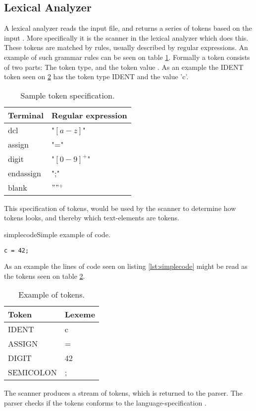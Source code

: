 \subsection{Lexical Analyzer}
A lexical analyzer reads the input file, and returns a series of tokens based on the input \citep{CraftingACompiler}. More specifically it is the scanner in the lexical analyzer which does this. These tokens are matched by rules, usually described by regular expressions. An example of such grammar rules can be seen on table \ref{tab:tokenspecification}. Formally a token consists of two parts: The token type, and the token value \citep{CraftingACompiler}. As an example the IDENT token seen on \ref{tab:tokensexample} has the token type IDENT and the value 'c'. 

\begin{table}[H]
\begin{tabular}{|l|l|}
\hline
    	Terminal  	& Regular expression 	\\ \hline
    	dcl       	& "$[a-z]$"      		\\ 
    	assign    	& "="      				\\ 
    	digit     	& "$[0-9]^+$"   		\\ 
    	endassign 	& ";"      				\\
    	blank 		& $" "^+$				\\
    \hline
\end{tabular}
\caption{Sample token specification.}
\label{tab:tokenspecification}
\end{table}
This specification of tokens, would be used by the scanner to determine how tokens looks, and thereby which text-elements are tokens. 

\begin{code}{simplecode}{Simple example of code.}
\begin{lstlisting}
c = 42;
\end{lstlisting}
\end{code}

As an example the lines of code seen on listing \ref{lst:simplecode} might be read as the tokens seen on table \ref{tab:tokensexample}.
\begin{table}[H]
\begin{tabular}{|l|l|}
\hline
    \textbf{Token}	&	\textbf{Lexeme} \\ \hline
    IDENT     		&	c      			\\ 
    ASSIGN    		&	=      			\\ 
    DIGIT     		&	42    			\\ 
    SEMICOLON 		&	;      			\\ \hline
\end{tabular}
\caption{Example of tokens.}
\label{tab:tokensexample}
\end{table}
The scanner produces a stream of tokens, which is returned to the parser. The parser checks if the tokens conforms to the language-specification \citep{CraftingACompiler}.